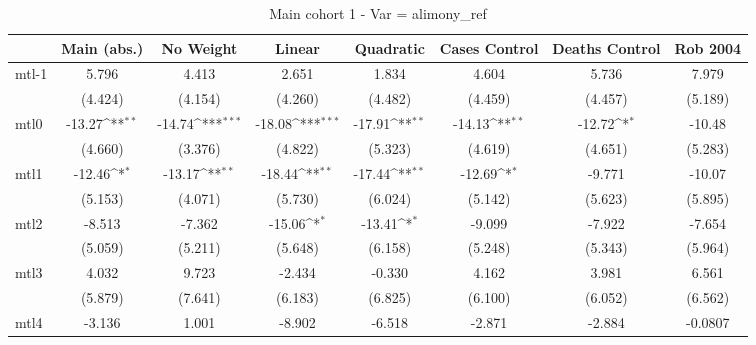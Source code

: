 \documentclass{article}
\begin{document}
{
\def\sym#1{\ifmmode^{#1}\else\(^{#1}\)\fi}
\begin{longtable}{l*{7}{c}}
\caption{Main cohort 1 - Var = alimony\_ref}\\
\hline\hline\endfirsthead\hline\endhead\hline\endfoot\endlastfoot
                &\multicolumn{1}{c}{Main (abs.)}&\multicolumn{1}{c}{No Weight}&\multicolumn{1}{c}{Linear}&\multicolumn{1}{c}{Quadratic}&\multicolumn{1}{c}{Cases Control}&\multicolumn{1}{c}{Deaths Control}&\multicolumn{1}{c}{Rob 2004}\\
\hline
mtl-1           &    5.796         &    4.413         &    2.651         &    1.834         &    4.604         &    5.736         &    7.979         \\
                &  (4.424)         &  (4.154)         &  (4.260)         &  (4.482)         &  (4.459)         &  (4.457)         &  (5.189)         \\
mtl0            &   -13.27\sym{**} &   -14.74\sym{***}&   -18.08\sym{***}&   -17.91\sym{**} &   -14.13\sym{**} &   -12.72\sym{*}  &   -10.48         \\
                &  (4.660)         &  (3.376)         &  (4.822)         &  (5.323)         &  (4.619)         &  (4.651)         &  (5.283)         \\
mtl1            &   -12.46\sym{*}  &   -13.17\sym{**} &   -18.44\sym{**} &   -17.44\sym{**} &   -12.69\sym{*}  &   -9.771         &   -10.07         \\
                &  (5.153)         &  (4.071)         &  (5.730)         &  (6.024)         &  (5.142)         &  (5.623)         &  (5.895)         \\
mtl2            &   -8.513         &   -7.362         &   -15.06\sym{*}  &   -13.41\sym{*}  &   -9.099         &   -7.922         &   -7.654         \\
                &  (5.059)         &  (5.211)         &  (5.648)         &  (6.158)         &  (5.248)         &  (5.343)         &  (5.964)         \\
mtl3            &    4.032         &    9.723         &   -2.434         &   -0.330         &    4.162         &    3.981         &    6.561         \\
                &  (5.879)         &  (7.641)         &  (6.183)         &  (6.825)         &  (6.100)         &  (6.052)         &  (6.562)         \\
mtl4            &   -3.136         &    1.001         &   -8.902         &   -6.518         &   -2.871         &   -2.884         &  -0.0807         \\

\end{longtable}}
\end{document}
